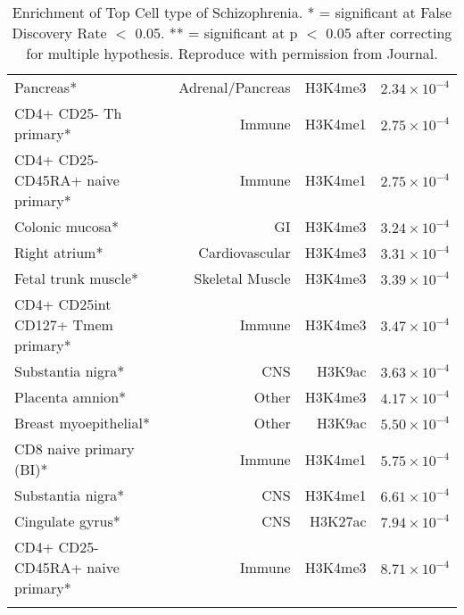 \begin{singlespace}
\begin{longtable}{p{6cm}rrr}
			Pancreas* & Adrenal/Pancreas & H3K4me3 & $2.34\times 10^{-4}$ \\
			CD4+ CD25- Th primary* & Immune & H3K4me1 & $2.75\times 10^{-4}$ \\
			CD4+ CD25- CD45RA+ naive primary* & Immune & H3K4me1 & $2.75\times 10^{-4}$\\
			Colonic mucosa* & GI    & H3K4me3 & $3.24\times 10^{-4}$ \\
			Right atrium* & Cardiovascular & H3K4me3 & $3.31\times 10^{-4}$ \\
			Fetal trunk muscle* & Skeletal Muscle & H3K4me3 & $3.39\times 10^{-4}$ \\
			CD4+ CD25int CD127+ Tmem primary* & Immune & H3K4me3 & $3.47\times 10^{-4}$ \\
			Substantia nigra* & CNS   & H3K9ac & $3.63\times 10^{-4}$ \\
			Placenta amnion* & Other & H3K4me3 & $4.17\times 10^{-4}$ \\
			Breast myoepithelial* & Other & H3K9ac & $5.50\times 10^{-4}$ \\
			CD8 naive primary (BI)* & Immune & H3K4me1 & $5.75\times 10^{-4}$ \\
			Substantia nigra* & CNS   & H3K4me1 & $6.61\times 10^{-4}$ \\
			Cingulate gyrus* & CNS   & H3K27ac & $7.94\times 10^{-4}$ \\
			CD4+ CD25- CD45RA+ naive primary* & Immune & H3K4me3 & $8.71\times 10^{-4}$ \\
			\bottomrule
		\caption[Enrichment of Top Cell Type of Schizophrenia]{Enrichment of Top Cell type of Schizophrenia.
			* = significant at False Discovery Rate $<$ 0.05.
			** = significant at p $<$ 0.05 after correcting for multiple hypothesis. 
			Reproduce with permission from Journal.\citep{Finucane2015}}
		\label{tab:cellTypeScz}%
	\end{longtable}%
	\end{singlespace}
	
